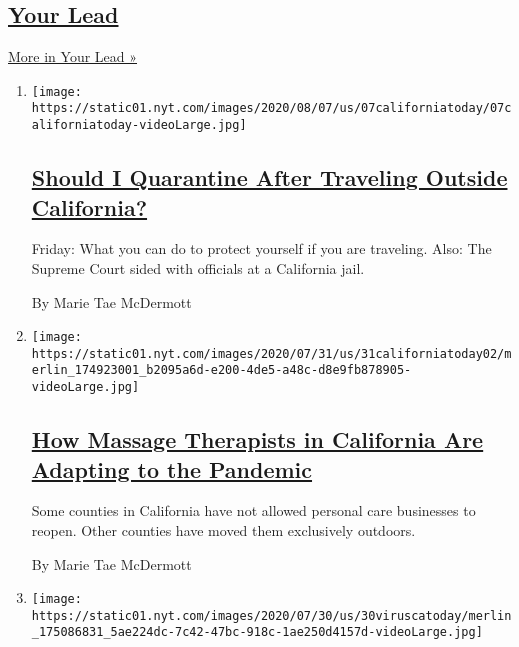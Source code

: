 \hypertarget{your-lead}{%
\subsection{\texorpdfstring{\href{/series/your-lead}{Your
Lead}}{Your Lead}}\label{your-lead}}

\href{/series/your-lead}{More in Your Lead »}

\begin{enumerate}
\def\labelenumi{\arabic{enumi}.}
\item
  \texttt{[image: https://static01.nyt.com/images/2020/08/07/us/07californiatoday/07californiatoday-videoLarge.jpg]}

  \hypertarget{should-i-quarantine-after-traveling-outside-california}{%
  \subsection{\texorpdfstring{\href{/2020/08/07/us/california-travel-restrictions-covid-19.html}{Should
  I Quarantine After Traveling Outside
  California?}}{Should I Quarantine After Traveling Outside California?}}\label{should-i-quarantine-after-traveling-outside-california}}

  Friday: What you can do to protect yourself if you are traveling.
  Also: The Supreme Court sided with officials at a California jail.

  By Marie Tae McDermott
\item
  \texttt{[image: https://static01.nyt.com/images/2020/07/31/us/31californiatoday02/merlin\_174923001\_b2095a6d-e200-4de5-a48c-d8e9fb878905-videoLarge.jpg]}

  \hypertarget{how-massage-therapists-in-california-are-adapting-to-the-pandemic}{%
  \subsection{\texorpdfstring{\href{/2020/07/31/us/essential-workers-massage-therapists.html}{How
  Massage Therapists in California Are Adapting to the
  Pandemic}}{How Massage Therapists in California Are Adapting to the Pandemic}}\label{how-massage-therapists-in-california-are-adapting-to-the-pandemic}}

  Some counties in California have not allowed personal care businesses
  to reopen. Other counties have moved them exclusively outdoors.

  By Marie Tae McDermott
\item
  \texttt{[image: https://static01.nyt.com/images/2020/07/30/us/30viruscatoday/merlin\_175086831\_5ae224dc-7c42-47bc-918c-1ae250d4157d-videoLarge.jpg]}


\end{enumerate}
